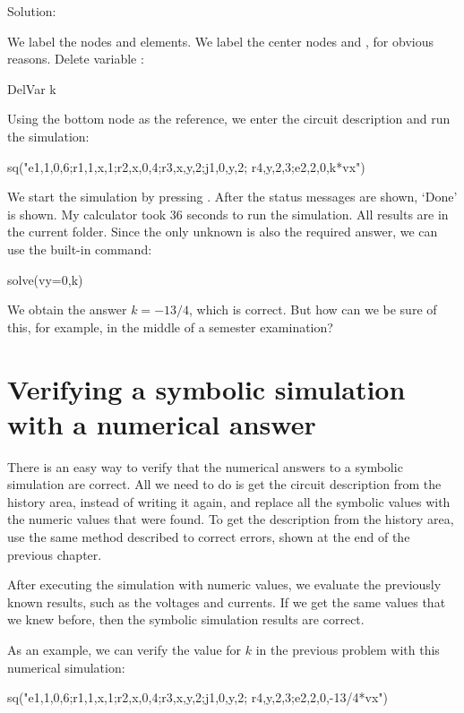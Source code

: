 Solution:

We label the nodes and elements. We label the center nodes 
and , for obvious reasons. Delete variable :

\begin{entry}
DelVar k
\end{entry}

Using the bottom node as the reference, we enter the circuit
description and run the simulation:

\begin{entry}
sq\dc("e1,1,0,6;r1,1,x,1;r2,x,0,4;r3,x,y,2;j1,0,y,2;
      r4,y,2,3;e2,2,0,k*vx")
\end{entry}

We start the simulation by pressing . After the status
messages are shown, `Done' is shown. My calculator took 36 seconds
to run the simulation. All results are in the current folder. Since
the only unknown is also the required answer, we can use the
built-in  command:

\begin{entry}
solve(vy=0,k)
\end{entry}

We obtain the answer $k = -13/4$, which is correct. But how can we
be sure of this, for example, in the middle of a semester
examination?

\section{Verifying a symbolic simulation with a numerical answer}

There is an easy way to verify that the numerical answers to a
symbolic simulation are correct. All we need to do is get the
circuit description from the history area, instead of writing it
again, and replace all the symbolic values with the numeric values
that were found. To get the description from the history area, use
the same method described to correct errors, shown at the end of the
previous chapter.

After executing the simulation with numeric values, we evaluate the
previously known results, such as the voltages and currents. If we
get the same values that we knew before, then the symbolic
simulation results are correct.

As an example, we can verify the value for $k$ in the previous
problem with this numerical simulation:

\begin{entry}
sq\dc("e1,1,0,6;r1,1,x,1;r2,x,0,4;r3,x,y,2;j1,0,y,2;
      r4,y,2,3;e2,2,0,-13/4*vx")
\end{entry}

